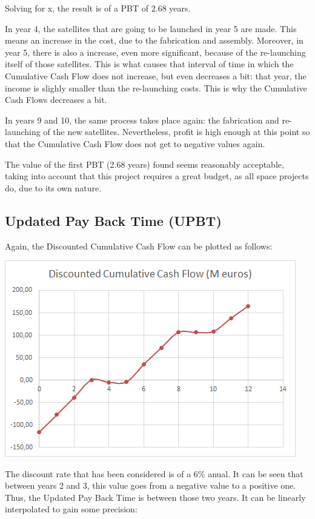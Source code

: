 Solving for x, the result is of a PBT of 2.68 years.

In year 4, the satellites that are going to be launched in year 5 are made. This means an increase in the cost, due to the fabrication and assembly. Moreover, in year 5, there is also a increase, even more significant, because of the re-launching itself of those satellites. This is what causes that interval of time in which the Cumulative Cash Flow does not increase, but even decreases a bit: that year, the income is slighly smaller than the re-launching costs. This is why the Cumulative Cash Flows decreases a bit.

In years 9 and 10, the same process takes place again: the fabrication and re-launching of the new satellites. Nevertheless, profit is high enough at this point so that the Cumulative Cash Flow does not get to negative values again. 

The value of the first PBT (2.68 years) found seems reasonably acceptable, taking into account that this project requires a great budget, as all space projects do, due to its own nature. 




\subsection{Updated Pay Back Time (UPBT)}
Again, the Discounted Cumulative Cash Flow can be plotted as follows:

\includegraphics{DCCF.png}

The discount rate that has been considered is of a 6\% anual. It can be seen that between years 2 and 3, this value goes from a negative value to a positive one. Thus, the Updated Pay Back Time is between those two years. It can be linearly interpolated to gain some precision:

